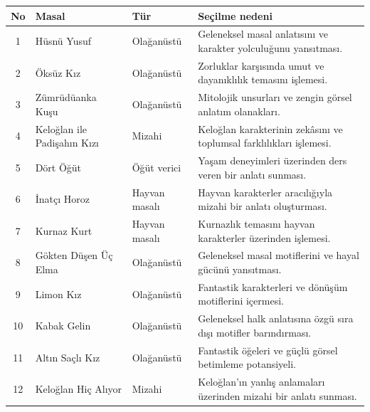 \documentclass[12pt,a4paper]{article}
\begin{document}
\begin{longtable}{@{}cp{4cm}p{3cm}p{5.4cm}@{}}
\toprule
\textbf{No} & \textbf{Masal} & \textbf{Tür} & \textbf{Seçilme nedeni} \\
\midrule
\endhead
1 & Hüsnü Yusuf & Olağanüstü & Geleneksel masal anlatısını ve karakter yolculuğunu yansıtması. \\
2 & Öksüz Kız & Olağanüstü & Zorluklar karşısında umut ve dayanıklılık temasını işlemesi. \\
3 & Zümrüdüanka Kuşu & Olağanüstü & Mitolojik unsurları ve zengin görsel anlatım olanakları. \\
4 & Keloğlan ile Padişahın Kızı & Mizahi & Keloğlan karakterinin zekâsını ve toplumsal farklılıkları işlemesi. \\
5 & Dört Öğüt & Öğüt verici & Yaşam deneyimleri üzerinden ders veren bir anlatı sunması. \\
6 & İnatçı Horoz & Hayvan masalı & Hayvan karakterler aracılığıyla mizahi bir anlatı oluşturması. \\
7 & Kurnaz Kurt & Hayvan masalı & Kurnazlık temasını hayvan karakterler üzerinden işlemesi. \\
8 & Gökten Düşen Üç Elma & Olağanüstü & Geleneksel masal motiflerini ve hayal gücünü yansıtması. \\
9 & Limon Kız & Olağanüstü & Fantastik karakterleri ve dönüşüm motiflerini içermesi. \\
10 & Kabak Gelin & Olağanüstü & Geleneksel halk anlatısına özgü sıra dışı motifler barındırması. \\
11 & Altın Saçlı Kız & Olağanüstü & Fantastik öğeleri ve güçlü görsel betimleme potansiyeli. \\
12 & Keloğlan Hiç Alıyor & Mizahi & Keloğlan'ın yanlış anlamaları üzerinden mizahi bir anlatı sunması. \\
\bottomrule
\end{longtable}


\end{document}
